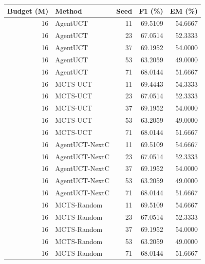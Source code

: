 \begin{tabular}{rlrrr}
\toprule
Budget (M) & Method & Seed & F1 (\%) & EM (\%) \\
\midrule
16 & AgentUCT & 11 & 69.5109 & 54.6667 \\
16 & AgentUCT & 23 & 67.0514 & 52.3333 \\
16 & AgentUCT & 37 & 69.1952 & 54.0000 \\
16 & AgentUCT & 53 & 63.2059 & 49.0000 \\
16 & AgentUCT & 71 & 68.0144 & 51.6667 \\
16 & MCTS-UCT & 11 & 69.4443 & 54.3333 \\
16 & MCTS-UCT & 23 & 67.0514 & 52.3333 \\
16 & MCTS-UCT & 37 & 69.1952 & 54.0000 \\
16 & MCTS-UCT & 53 & 63.2059 & 49.0000 \\
16 & MCTS-UCT & 71 & 68.0144 & 51.6667 \\
16 & AgentUCT-NextC & 11 & 69.5109 & 54.6667 \\
16 & AgentUCT-NextC & 23 & 67.0514 & 52.3333 \\
16 & AgentUCT-NextC & 37 & 69.1952 & 54.0000 \\
16 & AgentUCT-NextC & 53 & 63.2059 & 49.0000 \\
16 & AgentUCT-NextC & 71 & 68.0144 & 51.6667 \\
16 & MCTS-Random & 11 & 69.5109 & 54.6667 \\
16 & MCTS-Random & 23 & 67.0514 & 52.3333 \\
16 & MCTS-Random & 37 & 69.1952 & 54.0000 \\
16 & MCTS-Random & 53 & 63.2059 & 49.0000 \\
16 & MCTS-Random & 71 & 68.0144 & 51.6667 \\
\bottomrule
\end{tabular}
